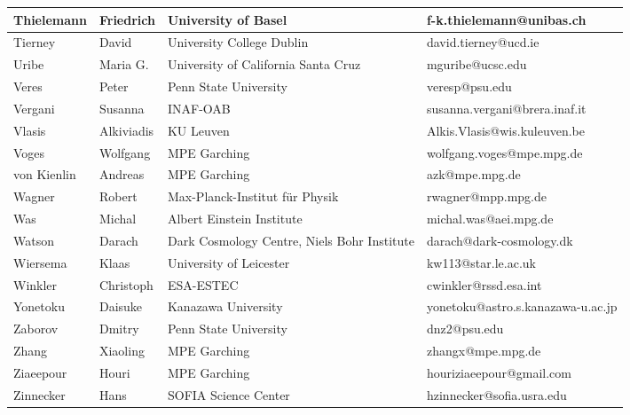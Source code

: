 \begin{center}
\begin{longtable}{|p{1.28cm} |p{1.28cm} |p{2.9cm} |p{3cm} |}
\tiny Thielemann &\tiny Friedrich & \tiny University of Basel & \tiny f-k.thielemann@unibas.ch \\ \hline
\tiny Tierney &\tiny David & \tiny University College Dublin & \tiny david.tierney@ucd.ie \\ \hline
\tiny Uribe &\tiny Maria G. & \tiny University of California Santa Cruz & \tiny mguribe@ucsc.edu \\ \hline
\tiny Veres &\tiny Peter & \tiny Penn State University & \tiny veresp@psu.edu \\ \hline
\tiny Vergani &\tiny Susanna & \tiny INAF-OAB & \tiny susanna.vergani@brera.inaf.it \\ \hline
\tiny Vlasis &\tiny Alkiviadis & \tiny KU Leuven & \tiny Alkis.Vlasis@wis.kuleuven.be \\ \hline
\tiny Voges &\tiny Wolfgang & \tiny MPE Garching & \tiny wolfgang.voges@mpe.mpg.de \\ \hline
\tiny von Kienlin &\tiny Andreas & \tiny MPE Garching & \tiny azk@mpe.mpg.de \\ \hline
\tiny Wagner &\tiny Robert & \tiny Max-Planck-Institut f\"ur Physik & \tiny rwagner@mpp.mpg.de \\ \hline
\tiny Was &\tiny Michal & \tiny Albert Einstein Institute & \tiny michal.was@aei.mpg.de \\ \hline
\tiny Watson &\tiny Darach & \tiny Dark Cosmology Centre, Niels Bohr Institute & \tiny darach@dark-cosmology.dk \\ \hline
\tiny Wiersema &\tiny Klaas & \tiny University of Leicester & \tiny kw113@star.le.ac.uk \\ \hline
\tiny Winkler &\tiny Christoph & \tiny ESA-ESTEC & \tiny cwinkler@rssd.esa.int \\ \hline
\tiny Yonetoku &\tiny Daisuke & \tiny Kanazawa University & \tiny yonetoku@astro.s.kanazawa-u.ac.jp \\ \hline
\tiny Zaborov &\tiny Dmitry & \tiny Penn State University & \tiny dnz2@psu.edu \\ \hline
\tiny Zhang &\tiny Xiaoling & \tiny MPE Garching & \tiny zhangx@mpe.mpg.de \\ \hline
\tiny Ziaeepour &\tiny Houri & \tiny MPE Garching & \tiny houriziaeepour@gmail.com \\ \hline
\tiny Zinnecker &\tiny Hans & \tiny SOFIA Science Center & \tiny hzinnecker@sofia.usra.edu \\ \hline
    \hline
  \end{longtable}
\end{center}
